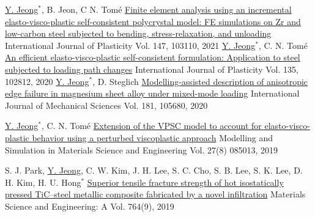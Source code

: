 
\begin{cventries}
  \cventry
  {\underline{Y. Jeong}$^*$, B. Jeon, C N. Tom\'{e}}
  {\href{https://doi.org/10.1016/j.ijplas.2021.103110}{Finite element analysis using an incremental elasto-visco-plastic self-consistent polycrystal model: FE simulations on Zr and low-carbon steel subjected to bending, stress-relaxation, and unloading}}
  {International Journal of Plasticity}
  {Vol. 147, 103110, 2021}
  {
  }
  \cventry
  {\underline{Y. Jeong}$^*$, C. N. Tom\'{e}}
  {\href{https://doi.org/10.1016/j.ijplas.2020.102812}{An efficient elasto-visco-plastic self-consistent formulation: Application to steel subjected to loading path changes}}
  {International Journal of Plasticity}
  {Vol. 135, 102812, 2020}
  {
  }
  \cventry
  {\underline{Y. Jeong}$^*$, D. Steglich}
  {\href{https://doi.org/10.1016/j.ijmecsci.2020.105680}{Modelling-assisted description of anisotropic edge failure in magnesium sheet alloy under mixed-mode loading}}
  {International Journal of Mechanical Sciences}
  {Vol. 181, 105680, 2020}
  {
  }

  \cventry
  {\underline{Y. Jeong}$^*$, C. N. Tom\'{e}}
  {\href{https://doi.org/10.1088/1361-651X/ab4b66}{Extension of the VPSC model to account for elasto-visco-plastic behavior using a perturbed viscoplastic approach}}
  {Modelling and Simulation in Materials Science and Engineering}
  {Vol. 27(8) 085013, 2019}
  {
  }

  \cventry
  {S. J. Park, \underline{Y. Jeong}, C. W. Kim, J. H. Lee, S. C. Cho, S. B. Lee, S. K. Lee, D. H. Kim, H. U. Hong$^*$}
  {\href{https://doi.org/10.1016/j.msea.2019.138260}{Superior tensile fracture strength of hot isostatically pressed TiC–steel metallic composite fabricated by a novel infiltration}}
  {Materials Science and Engineering: A}
  {Vol. 764(9), 2019}
  {
  }


\end{cventries}
